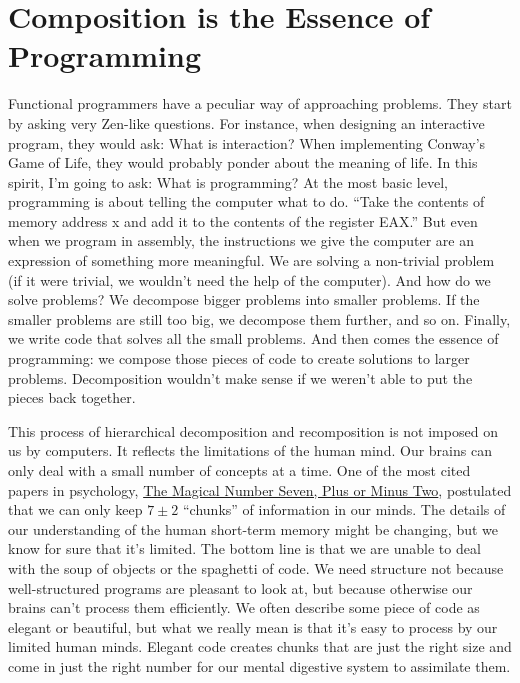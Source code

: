 \section{Composition is the Essence of
Programming}\label{composition-is-the-essence-of-programming}

Functional programmers have a peculiar way of approaching problems. They
start by asking very Zen-like questions. For instance, when designing an
interactive program, they would ask: What is interaction? When
implementing Conway's Game of Life, they would probably ponder about the
meaning of life. In this spirit, I'm going to ask: What is programming?
At the most basic level, programming is about telling the computer what
to do. ``Take the contents of memory address x and add it to the
contents of the register EAX.'' But even when we program in assembly,
the instructions we give the computer are an expression of something
more meaningful. We are solving a non-trivial problem (if it were
trivial, we wouldn't need the help of the computer). And how do we solve
problems? We decompose bigger problems into smaller problems. If the
smaller problems are still too big, we decompose them further, and so
on. Finally, we write code that solves all the small problems. And then
comes the essence of programming: we compose those pieces of code to
create solutions to larger problems. Decomposition wouldn't make sense
if we weren't able to put the pieces back together.

This process of hierarchical decomposition and recomposition is not
imposed on us by computers. It reflects the limitations of the human
mind. Our brains can only deal with a small number of concepts at a
time. One of the most cited papers in psychology,
\href{http://en.wikipedia.org/wiki/The_Magical_Number_Seven,_Plus_or_Minus_Two}{The
Magical Number Seven, Plus or Minus Two}, postulated that we can only
keep $7 \pm 2$ ``chunks'' of information in our minds. The details of our
understanding of the human short-term memory might be changing, but we
know for sure that it's limited. The bottom line is that we are unable
to deal with the soup of objects or the spaghetti of code. We need
structure not because well-structured programs are pleasant to look at,
but because otherwise our brains can't process them efficiently. We
often describe some piece of code as elegant or beautiful, but what we
really mean is that it's easy to process by our limited human minds.
Elegant code creates chunks that are just the right size and come in
just the right number for our mental digestive system to assimilate
them.

